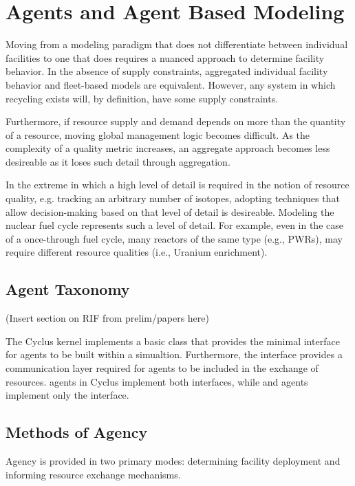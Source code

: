
\section{Agents and Agent Based Modeling}\label{abm:abm}

Moving from a modeling paradigm that does not differentiate between individual
facilities to one that does requires a nuanced approach to determine facility
behavior. In the absence of supply constraints, aggregated individual facility
behavior and fleet-based models are equivalent. However, any system in which
recycling exists will, by definition, have some supply constraints. 

Furthermore, if resource supply and demand depends on more than the quantity of
a resource, moving global management logic becomes difficult. As the complexity
of a quality metric increases, an aggregate approach becomes less desireable as
it loses such detail through aggregation.

In the extreme in which a high level of detail is required in the notion of
resource quality, e.g. tracking an arbitrary number of isotopes, adopting
techniques that allow decision-making based on that level of detail is
desireable. Modeling the nuclear fuel cycle represents such a level of
detail. For example, even in the case of a once-through fuel cycle, many
reactors of the same type (e.g., PWRs), may require different resource qualities
(i.e., Uranium enrichment).

\subsection{Agent Taxonomy}

(Insert section on RIF from prelim/papers here)

The Cyclus kernel implements a basic  class that provides the
minimal interface for agents to be built within a simualtion. Furthermore, the
 interface provides a communication layer required for agents to be
included in the exchange of resources.  agents in Cyclus
implement both interfaces, while  and  agents
implement only the  interface.

\subsection{Methods of Agency}

Agency is provided in two primary modes: determining facility deployment and
informing resource exchange mechanisms. 

